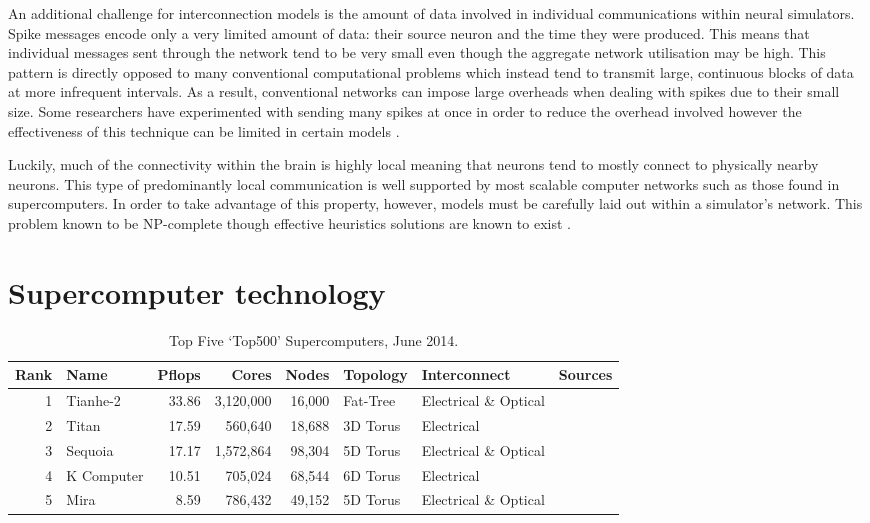 			An additional challenge for interconnection models is the amount of data
			involved in individual communications within neural simulators. Spike
			messages encode only a very limited amount of data: their source neuron
			and the time they were produced. This means that individual messages sent
			through the network tend to be very small even though the aggregate
			network utilisation may be high. This pattern is directly opposed to many
			conventional computational problems which instead tend to transmit large,
			continuous blocks of data at more infrequent intervals. As a result,
			conventional networks can impose large overheads when dealing with spikes
			due to their small size. Some researchers have experimented with sending
			many spikes at once in order to reduce the overhead involved however the
			effectiveness of this technique can be limited in certain models
			\cite{morrison05}.
			
			Luckily, much of the connectivity within the brain is highly local meaning
			that neurons tend to mostly connect to physically nearby neurons. This
			type of predominantly local communication is well supported by most
			scalable computer networks such as those found in supercomputers. In order
			to take advantage of this property, however, models must be carefully laid
			out within a simulator's network. This problem known to be NP-complete
			though effective heuristics solutions are known to exist \cite{haldar00}.
		
		
	
	\section{Supercomputer technology}
		\label{sec:supercomputers}
		
		\begin{table}
			\center
			\begin{tabular}{r l r r r l l l}
				\toprule
				Rank & Name    & Pflops& Cores  & Nodes  & Topology & Interconnect          & Sources \\
				\midrule                          
				1 & Tianhe-2   & 33.86 & 3,120,000 & 16,000 & Fat-Tree & Electrical \& Optical & \cite{dongarra13} \\
				2 & Titan      & 17.59 & 560,640   & 18,688 & 3D Torus & Electrical            & \cite{bland12} \\
				3 & Sequoia    & 17.17 & 1,572,864 & 98,304 & 5D Torus & Electrical \& Optical & \cite{prickett10} \\
				4 & K Computer & 10.51 & 705,024   & 68,544 & 6D Torus & Electrical            & \cite{fujitsu11,yokokawa11} \\
				5 & Mira       &  8.59 & 786,432   & 49,152 & 5D Torus & Electrical \& Optical & \cite{prickett10} \\
				\bottomrule
			\end{tabular}
			
			\caption{Top Five `Top500' Supercomputers, June 2014.}
			\label{tab:top500}
		\end{table}
		
